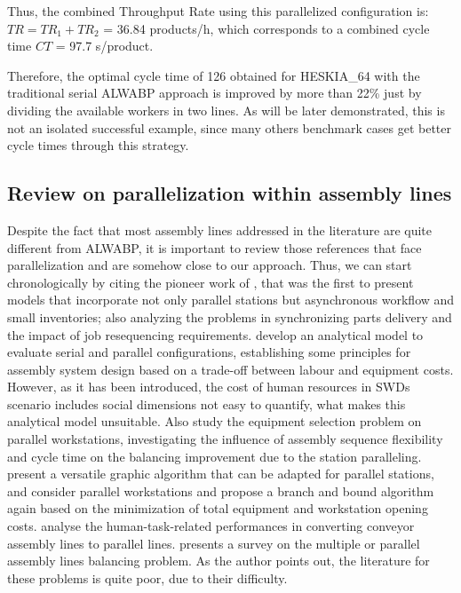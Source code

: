 \documentclass{singlecol-new}
\begin{document}
Thus, the combined Throughput Rate using this parallelized configuration is:
$TR = TR_1 + TR_2$ = 36.84 products/h, which corresponds to a combined cycle time $CT$ = 97.7 s/product.

Therefore, the optimal cycle time of 126 obtained for HESKIA\_64 with the traditional serial ALWABP approach is improved by more than 22\% just by dividing the available workers in two lines. As will be later demonstrated, this is not an isolated successful example, since many others benchmark cases get better cycle times through this strategy.

\subsection{Review on parallelization within assembly lines}

Despite the fact that most assembly lines addressed in the literature are quite different from ALWABP, it is important to review those references that face parallelization and are somehow close to our approach. Thus, we can start chronologically by citing the pioneer work of \cite{buzacott1990abandoning}, that was the first to present models that incorporate not only parallel stations but asynchronous workflow and small inventories; also analyzing the problems in synchronizing parts delivery and the impact of job resequencing requirements. \cite{daganzo1994assembly} develop an analytical model to evaluate serial and parallel configurations, establishing some principles for assembly system design based on a trade-off between labour and equipment costs. However, as it has been introduced, the cost of human resources in SWDs scenario includes social dimensions not easy to quantify, what makes this analytical model unsuitable. Also \cite{bukchin03weighted} study the equipment selection problem on parallel workstations, investigating the influence of assembly sequence flexibility and cycle time on the balancing improvement due to the station paralleling. \cite{boysen08versatile} present a versatile graphic algorithm that can be adapted for parallel stations, and \cite{ege09assembly} consider parallel workstations and propose a branch and bound algorithm again based on the minimization of total equipment and workstation opening costs. \cite{kaku2008study} analyse the human-task-related performances in converting conveyor assembly lines to parallel lines. \cite{lusa2008survey} presents a survey on the multiple or parallel assembly lines balancing problem. As the author points out, the literature for these problems is quite poor, due to their difficulty.
\end{document}
